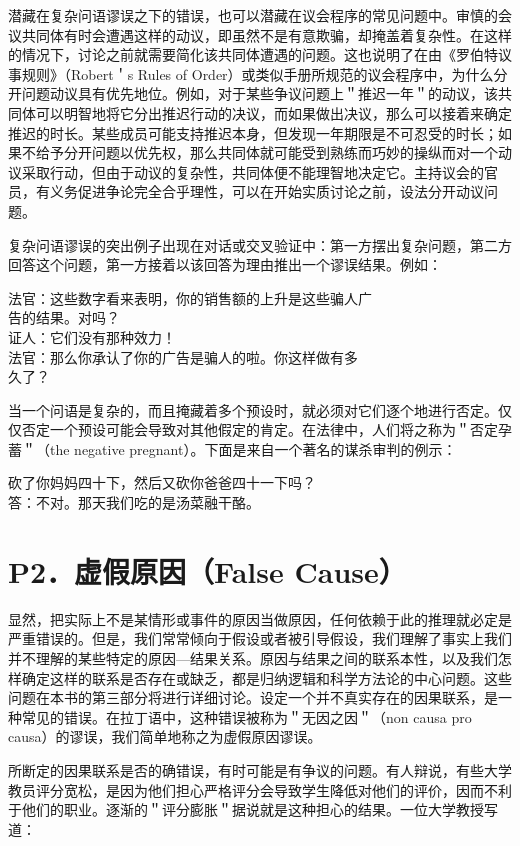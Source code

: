 潜藏在复杂问语谬误之下的错误，也可以潜藏在议会程序的常见问题中。审慎的会议共同体有时会遭遇这样的动议，即虽然不是有意欺骗，却掩盖着复杂性。在这样的情况下，讨论之前就需要简化该共同体遭遇的问题。这也说明了在由《罗伯特议事规则》（Robert＇s Rules of Order）或类似手册所规范的议会程序中，为什么分开问题动议具有优先地位。例如，对于某些争议问题上＂推迟一年＂的动议，该共同体可以明智地将它分出推迟行动的决议，而如果做出决议，那么可以接着来确定推迟的时长。某些成员可能支持推迟本身，但发现一年期限是不可忍受的时长；如果不给予分开问题以优先权，那么共同体就可能受到熟练而巧妙的操纵而对一个动议采取行动，但由于动议的复杂性，共同体便不能理智地决定它。主持议会的官员，有义务促进争论完全合乎理性，可以在开始实质讨论之前，设法分开动议问题。

复杂问语谬误的突出例子出现在对话或交叉验证中：第一方摆出复杂问题，第二方回答这个问题，第一方接着以该回答为理由推出一个谬误结果。例如：

\begin{displayquote}
法官：这些数字看来表明，你的销售额的上升是这些骗人广\\
告的结果。对吗？\\
证人：它们没有那种效力！\\
法官：那么你承认了你的广告是骗人的啦。你这样做有多\\
久了？
\end{displayquote}

当一个问语是复杂的，而且掩藏着多个预设时，就必须对它们逐个地进行否定。仅仅否定一个预设可能会导致对其他假定的肯定。在法律中，人们将之称为＂否定孕蓄＂（the negative pregnant）。下面是来自一个著名的谋杀审判的例示：

砍了你妈妈四十下，然后又砍你爸爸四十一下吗？\\
答：不对。那天我们吃的是汤菜融干酪。

\section*{P2．虚假原因（False Cause）}
显然，把实际上不是某情形或事件的原因当做原因，任何依赖于此的推理就必定是严重错误的。但是，我们常常倾向于假设或者被引导假设，我们理解了事实上我们并不理解的某些特定的原因—结果关系。原因与结果之间的联系本性，以及我们怎样确定这样的联系是否存在或缺乏，都是归纳逻辑和科学方法论的中心问题。这些问题在本书的第三部分将进行详细讨论。设定一个并不真实存在的因果联系，是一种常见的错误。在拉丁语中，这种错误被称为＂无因之因＂（non causa pro causa）的谬误，我们简单地称之为虚假原因谬误。

所断定的因果联系是否的确错误，有时可能是有争议的问题。有人辩说，有些大学教员评分宽松，是因为他们担心严格评分会导致学生降低对他们的评价，因而不利于他们的职业。逐渐的＂评分膨胀＂据说就是这种担心的结果。一位大学教授写道：

